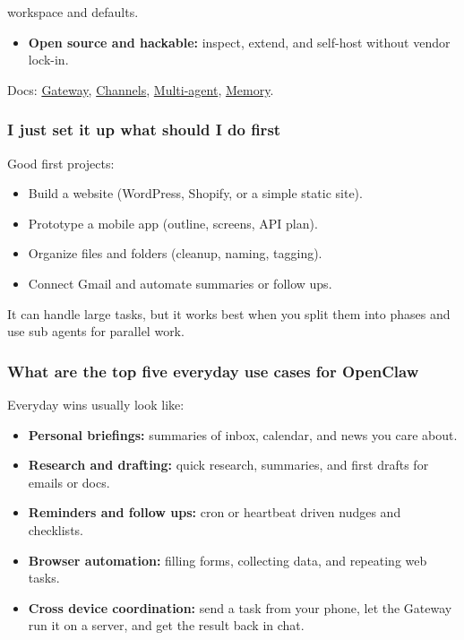 workspace and defaults.
\begin{itemize}
  \item \textbf{Open source and hackable:} inspect, extend, and self-host without vendor lock-in.
\end{itemize}


Docs: \href{/gateway}{Gateway}, \href{/channels}{Channels}, \href{/concepts/multi-agent}{Multi-agent},
\href{/concepts/memory}{Memory}.

\subsubsection{I just set it up what should I do first}


Good first projects:

\begin{itemize}
  \item Build a website (WordPress, Shopify, or a simple static site).
  \item Prototype a mobile app (outline, screens, API plan).
  \item Organize files and folders (cleanup, naming, tagging).
  \item Connect Gmail and automate summaries or follow ups.
\end{itemize}


It can handle large tasks, but it works best when you split them into phases and
use sub agents for parallel work.

\subsubsection{What are the top five everyday use cases for OpenClaw}


Everyday wins usually look like:

\begin{itemize}
  \item \textbf{Personal briefings:} summaries of inbox, calendar, and news you care about.
  \item \textbf{Research and drafting:} quick research, summaries, and first drafts for emails or docs.
  \item \textbf{Reminders and follow ups:} cron or heartbeat driven nudges and checklists.
  \item \textbf{Browser automation:} filling forms, collecting data, and repeating web tasks.
  \item \textbf{Cross device coordination:} send a task from your phone, let the Gateway run it on a server, and get the result back in chat.
\end{itemize}


